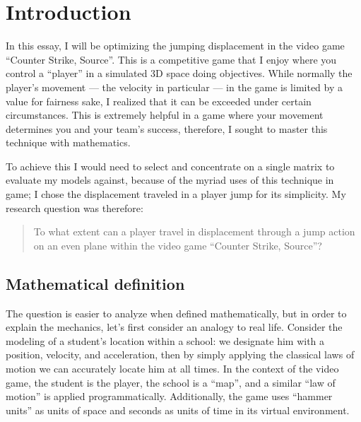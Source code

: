 \section{Introduction}


In this essay, I will be optimizing the jumping displacement in the video game ``Counter Strike, Source''. This is a competitive game that I enjoy where you control a ``player'' in a simulated 3D space doing objectives. While normally the player's movement --- the velocity in particular --- in the game is limited by a value for fairness sake, I realized that it can be exceeded under certain circumstances. This is extremely helpful in a game where your movement determines you and your team's success, therefore, I sought to master this technique with mathematics.


To achieve this I would need to select and concentrate on a single matrix to evaluate my models against, because of the myriad uses of this technique in game; I chose the displacement traveled in a player jump for its simplicity. My research question was therefore:
\begin{quote}
    To what extent can a player travel in displacement through a jump action on an even plane within the video game ``Counter Strike, Source''?
\end{quote}

\subsection{Mathematical definition}
The question is easier to analyze when defined mathematically, but in order to explain the mechanics, let's first consider an analogy to real life. Consider the modeling of a student's location within a school: we designate him with a position, velocity, and acceleration, then by simply applying the classical laws of motion we can accurately locate him at all times. In the context of the video game, the student is the player, the school is a ``map'', and a similar ``law of motion'' is applied programmatically. Additionally, the game uses ``hammer units'' as units of space and seconds as units of time in its virtual environment.


